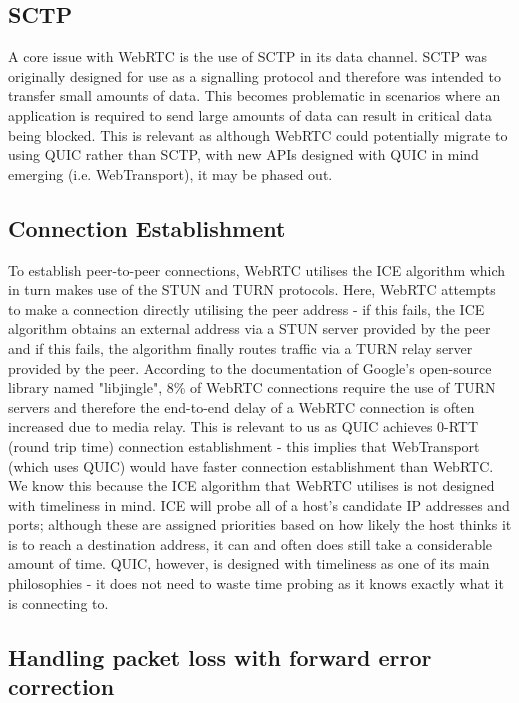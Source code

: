\subsection{SCTP}

A core issue with WebRTC is the use of SCTP in its data channel. SCTP was originally designed for use as a signalling protocol and therefore was intended to transfer small amounts of data. This becomes problematic in scenarios where an application is required to send large amounts of data can result in critical data being blocked. \cite{webrtc_mozilla} This is relevant as although WebRTC could potentially migrate to using QUIC rather than SCTP, with new APIs designed with QUIC in mind emerging (i.e. WebTransport), it may be phased out. 

\subsection{Connection Establishment}

To establish peer-to-peer connections, WebRTC utilises the ICE algorithm which in turn makes use of the STUN and TURN protocols. Here, WebRTC attempts to make a connection directly utilising the peer address - if this fails, the ICE algorithm obtains an external address via a STUN server provided by the peer and if this fails, the algorithm finally routes traffic via a TURN relay server provided by the peer. \cite{jadhav2021} According to the documentation of Google's open-source library named "libjingle", 8\% of WebRTC connections require the use of TURN servers and therefore the end-to-end delay of a WebRTC connection is often increased due to media relay. \cite{garcia2019} This is relevant to us as QUIC achieves 0-RTT (round trip time) connection establishment - this implies that WebTransport (which uses QUIC) would have faster connection establishment than WebRTC. We know this because the ICE algorithm that WebRTC utilises is not designed with timeliness in mind. ICE will probe all of a host's candidate IP addresses and ports; although these are assigned priorities based on how likely the host thinks it is to reach a destination address, it can and often does still take a considerable amount of time. QUIC, however, is designed with timeliness as one of its main philosophies - it does not need to waste time probing as it knows exactly what it is connecting to.

\subsection{Handling packet loss with forward error correction}

